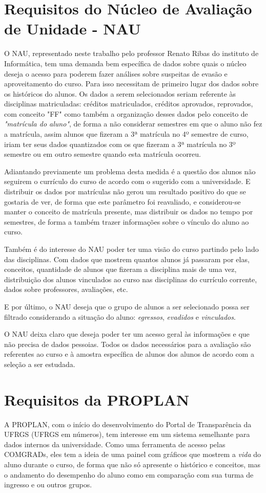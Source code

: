 \documentclass[cic,tc]{iiufrgs}
\begin{document}
\section{Requisitos do Núcleo de Avaliação de Unidade - NAU}
O NAU, representado neste trabalho pelo professor Renato Ribas do instituto de Informática, tem uma demanda bem específica de dados sobre quais o núcleo deseja o acesso para poderem fazer análises sobre suspeitas de evasão e aproveitamento do curso.
Para isso necessitam de primeiro lugar dos dados sobre os históricos do alunos. Os dados a serem selecionados seriam referente às disciplinas matriculadas: créditos matriculados, créditos aprovados, reprovados, com conceito "FF" como também a organização desses dados pelo conceito de \textit{"matrícula do aluno"}, de forma a não considerar semestres em que o aluno não fez a matrícula, assim alunos que fizeram a 3ª matrícula no 4º semestre de curso, iriam ter seus dados quantizados com os que fizeram a 3ª matrícula no 3º semestre ou em outro semestre quando esta matrícula ocorreu.

Adiantando previamente um problema desta medida é a questão dos alunos não seguirem o currículo do curso de acordo com o sugerido com a universidade. E distribuir os dados por matrículas não gerou um resultado positivo do que se gostaria de ver, de forma que este parâmetro foi reavaliado, e considerou-se manter o conceito de matrícula presente, mas distribuir os dados no tempo por semestres, de forma a também trazer informações sobre o vínculo do aluno ao curso.

Também é do interesse do NAU poder ter uma visão do curso partindo pelo lado das disciplinas. Com dados que mostrem quantos alunos já passaram por elas, conceitos, quantidade de alunos que fizeram a disciplina mais de uma vez, distribuição dos alunos vinculados ao curso nas disciplinas do currículo corrente, dados sobre professores, avaliações, etc.

E por último, o NAU deseja que o grupo de alunos a ser selecionado possa ser filtrado considerando a situação do aluno: \textit{egressos}, \textit{evadidos} e \textit{vinculados}.

O NAU deixa claro que deseja poder ter um acesso geral às informações e que não precisa de dados pessoias. Todos os dados necessários para a avaliação são referentes ao curso e à amostra específica de alunos dos alunos de acordo com a seleção a ser estudada. 

\section{Requisitos da PROPLAN}
A PROPLAN, com o início do desenvolvimento do Portal de Transparência da UFRGS (UFRGS em números), tem interesse em um sistema semelhante para dados internos da universidade. Como uma ferramenta de acesso pelas COMGRADs, eles tem a ideia de uma painel com gráficos que mostrem a \textit{vida} do aluno durante o curso, de forma que não só apresente o histórico e conceitos, mas o andamento do desempenho do aluno como em comparação com sua turma de ingresso e ou outros grupos. 
\end{document}
